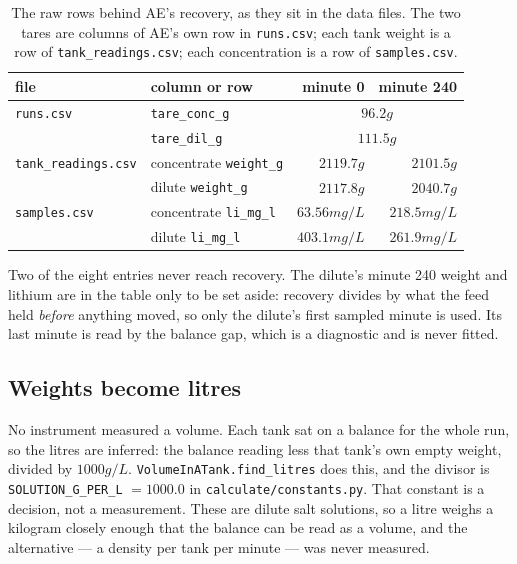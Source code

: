 \begin{table}[htbp]
\centering
\caption{The raw rows behind AE's recovery, as they sit in the data files. The two tares are
columns of AE's own row in \texttt{runs.csv}; each tank weight is a row of
\texttt{tank\_readings.csv}; each concentration is a row of \texttt{samples.csv}.}
\label{tab:ae-raw-rows}
\begin{tabular}{llrr}
\toprule
file & column or row & minute 0 & minute 240 \\
\midrule
\texttt{runs.csv}          & \texttt{tare\_conc\_g}  & \multicolumn{2}{c}{$96.2\unit{g}$} \\
                           & \texttt{tare\_dil\_g}   & \multicolumn{2}{c}{$111.5\unit{g}$} \\
\addlinespace
\texttt{tank\_readings.csv}& concentrate \texttt{weight\_g} & $2119.7\unit{g}$ & $2101.5\unit{g}$ \\
                           & dilute \texttt{weight\_g}      & $2117.8\unit{g}$ & $2040.7\unit{g}$ \\
\addlinespace
\texttt{samples.csv}       & concentrate \texttt{li\_mg\_l}
                           & $63.56\unit{mg/L}$ & $218.5\unit{mg/L}$ \\
                           & dilute \texttt{li\_mg\_l}
                           & $403.1\unit{mg/L}$ & $261.9\unit{mg/L}$ \\
\bottomrule
\end{tabular}
\end{table}

Two of the eight entries never reach recovery. The dilute's minute 240 weight and lithium are
in the table only to be set aside: recovery divides by what the feed held \emph{before}
anything moved, so only the dilute's first sampled minute is used. Its last minute is read by
the balance gap, which is a diagnostic and is never fitted.

\subsection{Weights become litres}

No instrument measured a volume. Each tank sat on a balance for the whole run, so the litres
are inferred: the balance reading less that tank's own empty weight, divided by
$1000\unit{g/L}$. \texttt{VolumeInATank.find\_litres} does this, and the divisor is
\texttt{SOLUTION\_\allowbreak G\_\allowbreak PER\_\allowbreak L} $= 1000.0$ in \texttt{calculate/\allowbreak constants.py}. That constant is a
decision, not a measurement. These are dilute salt solutions, so a litre weighs a kilogram
closely enough that the balance can be read as a volume, and the alternative --- a density per
tank per minute --- was never measured.

